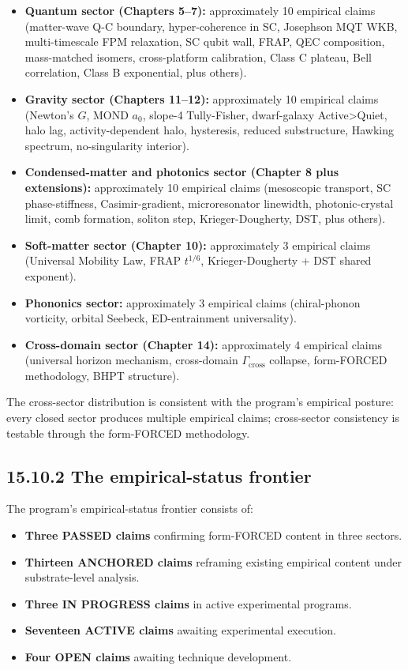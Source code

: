 \documentclass[11pt]{book}
\begin{document}
\begin{itemize}
\item \textbf{Quantum sector (Chapters 5–7):} approximately 10 empirical claims (matter-wave Q-C boundary, hyper-coherence in SC, Josephson MQT WKB, multi-timescale FPM relaxation, SC qubit wall, FRAP, QEC composition, mass-matched isomers, cross-platform calibration, Class C plateau, Bell correlation, Class B exponential, plus others).
\item \textbf{Gravity sector (Chapters 11–12):} approximately 10 empirical claims (Newton's $G$, MOND $a_0$, slope-4 Tully-Fisher, dwarf-galaxy Active>Quiet, halo lag, activity-dependent halo, hysteresis, reduced substructure, Hawking spectrum, no-singularity interior).
\item \textbf{Condensed-matter and photonics sector (Chapter 8 plus extensions):} approximately 10 empirical claims (mesoscopic transport, SC phase-stiffness, Casimir-gradient, microresonator linewidth, photonic-crystal limit, comb formation, soliton step, Krieger-Dougherty, DST, plus others).
\item \textbf{Soft-matter sector (Chapter 10):} approximately 3 empirical claims (Universal Mobility Law, FRAP $t^{1/6}$, Krieger-Dougherty + DST shared exponent).
\item \textbf{Phononics sector:} approximately 3 empirical claims (chiral-phonon vorticity, orbital Seebeck, ED-entrainment universality).
\item \textbf{Cross-domain sector (Chapter 14):} approximately 4 empirical claims (universal horizon mechanism, cross-domain $\Gamma_\mathrm{cross}$ collapse, form-FORCED methodology, BHPT structure).
\end{itemize}

The cross-sector distribution is consistent with the program's empirical posture: every closed sector produces multiple empirical claims; cross-sector consistency is testable through the form-FORCED methodology.

\subsection{15.10.2 The empirical-status frontier}

The program's empirical-status frontier consists of:
\begin{itemize}
\item \textbf{Three PASSED claims} confirming form-FORCED content in three sectors.
\item \textbf{Thirteen ANCHORED claims} reframing existing empirical content under substrate-level analysis.
\item \textbf{Three IN PROGRESS claims} in active experimental programs.
\item \textbf{Seventeen ACTIVE claims} awaiting experimental execution.
\item \textbf{Four OPEN claims} awaiting technique development.
\end{itemize}
\end{document}

